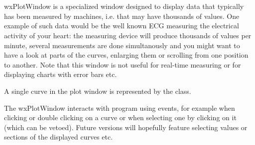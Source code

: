 %
%

\section{}\label{wxplotwindow}

wxPlotWindow is a specialized window designed to display data that typically has
been measured by machines, i.e. that may have thousands of values. One example of
such data would be the well known ECG measuring the electrical activity of your
heart: the measuring device will produce thousands of values per minute, several
measurements are done simultanously and you might want to have a look at parts
of the curves, enlarging them or scrolling from one position to another. Note
that this window is not useful for real-time measuring or for displaying charts
with error bars etc.

A single curve in the plot window is represented by the 
class.

The wxPlotWindow interacts with program using events, for example when clicking
or double clicking on a curve or when selecting one by clicking on it (which
can be vetoed). Future versions will hopefully feature selecting values or
sections of the displayed curves etc.


\\
\\
\\
\\


\begin{twocollist}\itemsep=0pt
\end{twocollist}

